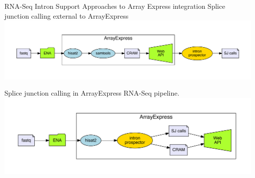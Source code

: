 \documentclass[10pt,
               hyperref={bookmarks=false,
                         bookmarksopen=false,
                         colorlinks=true,
                         linkcolor=blue,
                         urlcolor=blue},
               xcolor={svgnames,table}]{beamer}
\begin{document}
\begin{frame}{RNA-Seq Intron Support}
  Approaches to Array Express integration
  \centering
  Splice junction calling external to ArrayExpress
  \includegraphics[scale=0.42]{images/calling_external.pdf}

  Splice junction calling in ArrayExpress RNA-Seq pipeline.
  \includegraphics[scale=0.42]{images/calling_at_array_express.pdf}
\end{frame}

\end{document}
